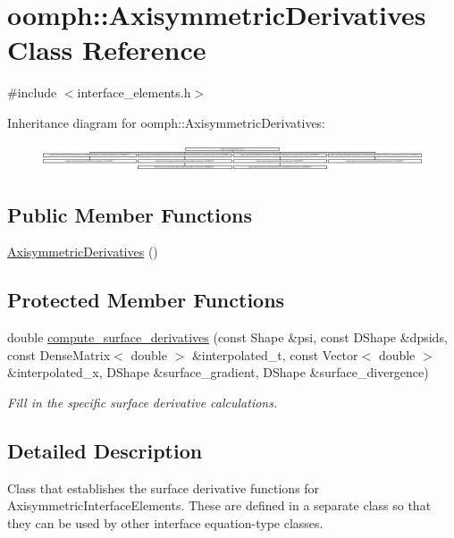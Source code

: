 \hypertarget{classoomph_1_1AxisymmetricDerivatives}{}\section{oomph\+:\+:Axisymmetric\+Derivatives Class Reference}
\label{classoomph_1_1AxisymmetricDerivatives}


{\ttfamily \#include $<$interface\+\_\+elements.\+h$>$}

Inheritance diagram for oomph\+:\+:Axisymmetric\+Derivatives\+:\begin{figure}[H]
\begin{center}
\leavevmode
\includegraphics[height=0.794326cm]{classoomph_1_1AxisymmetricDerivatives}
\end{center}
\end{figure}
\subsection*{Public Member Functions}
\begin{DoxyCompactItemize}
\item 
\hyperlink{classoomph_1_1AxisymmetricDerivatives_a91b259ef45c7563b05bf79de4b0fe4bf}{Axisymmetric\+Derivatives} ()
\end{DoxyCompactItemize}
\subsection*{Protected Member Functions}
\begin{DoxyCompactItemize}
\item 
double \hyperlink{classoomph_1_1AxisymmetricDerivatives_a306ea6b57d09d57e87e8d74a13c2f828}{compute\+\_\+surface\+\_\+derivatives} (const Shape \&psi, const D\+Shape \&dpsids, const Dense\+Matrix$<$ double $>$ \&interpolated\+\_\+t, const Vector$<$ double $>$ \&interpolated\+\_\+x, D\+Shape \&surface\+\_\+gradient, D\+Shape \&surface\+\_\+divergence)
\begin{DoxyCompactList}\small\item\em Fill in the specific surface derivative calculations. \end{DoxyCompactList}\end{DoxyCompactItemize}


\subsection{Detailed Description}
Class that establishes the surface derivative functions for Axisymmetric\+Interface\+Elements. These are defined in a separate class so that they can be used by other interface equation-\/type classes. 

